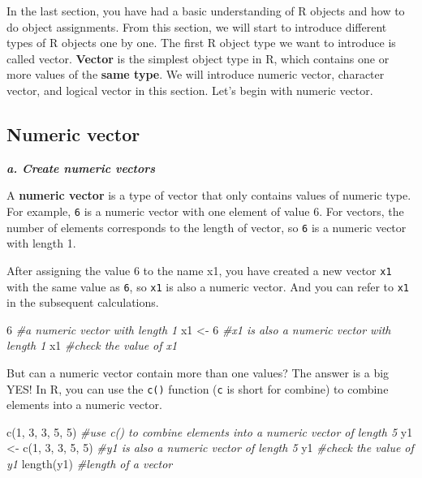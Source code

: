 \documentclass[
]{book}
\newenvironment{Shaded}{\begin{snugshade}}{\end{snugshade}}
\newcommand{\CommentTok}[1]{\textcolor[rgb]{0.56,0.35,0.01}{\textit{#1}}}
\newcommand{\DecValTok}[1]{\textcolor[rgb]{0.00,0.00,0.81}{#1}}
\newcommand{\FunctionTok}[1]{\textcolor[rgb]{0.00,0.00,0.00}{#1}}
\newcommand{\NormalTok}[1]{#1}
\newcommand{\OtherTok}[1]{\textcolor[rgb]{0.56,0.35,0.01}{#1}}
\begin{document}
In the last section, you have had a basic understanding of R objects and how to do object assignments. From this section, we will start to introduce different types of R objects one by one. The first R object type we want to introduce is called vector. \textbf{Vector} is the simplest object type in R, which contains one or more values of the \textbf{same type}. We will introduce numeric vector, character vector, and logical vector in this section. Let's begin with numeric vector.

\hypertarget{numeric-vector}{%
\subsection{Numeric vector}\label{numeric-vector}}

\textbf{\emph{a. Create numeric vectors}}

A \textbf{numeric vector} is a type of vector that only contains values of numeric type. For example, \texttt{6} is a numeric vector with one element of value 6. For vectors, the number of elements corresponds to the length of vector, so \texttt{6} is a numeric vector with length 1.

After assigning the value 6 to the name x1, you have created a new vector \texttt{x1} with the same value as \texttt{6}, so \texttt{x1} is also a numeric vector. And you can refer to \texttt{x1} in the subsequent calculations.

\begin{Shaded}
\begin{Highlighting}[]
\DecValTok{6}                         \CommentTok{\#a numeric vector with length 1}
\NormalTok{x1 }\OtherTok{\textless{}{-}} \DecValTok{6}                   \CommentTok{\#x1 is also a numeric vector with length 1}
\NormalTok{x1                        }\CommentTok{\#check the value of x1}
\end{Highlighting}
\end{Shaded}

But can a numeric vector contain more than one values? The answer is a big YES! In R, you can use the \texttt{c()} function (\texttt{c} is short for combine) to combine elements into a numeric vector.

\begin{Shaded}
\begin{Highlighting}[]
\FunctionTok{c}\NormalTok{(}\DecValTok{1}\NormalTok{, }\DecValTok{3}\NormalTok{, }\DecValTok{3}\NormalTok{, }\DecValTok{5}\NormalTok{, }\DecValTok{5}\NormalTok{)          }\CommentTok{\#use c() to combine elements into a numeric vector of length 5}
\NormalTok{y1 }\OtherTok{\textless{}{-}} \FunctionTok{c}\NormalTok{(}\DecValTok{1}\NormalTok{, }\DecValTok{3}\NormalTok{, }\DecValTok{3}\NormalTok{, }\DecValTok{5}\NormalTok{, }\DecValTok{5}\NormalTok{)    }\CommentTok{\#y1 is also a numeric vector of length 5}
\NormalTok{y1                        }\CommentTok{\#check the value of y1}
\FunctionTok{length}\NormalTok{(y1)                }\CommentTok{\#length of a vector}
\end{Highlighting}
\end{Shaded}
\end{document}
